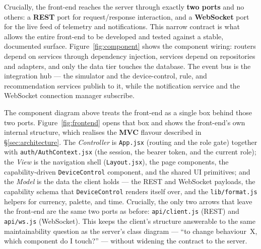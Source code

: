 Crucially, the front-end reaches the server through exactly \textbf{two ports} and no
others: a \textbf{REST} port for request/response interaction, and a
\textbf{WebSocket} port for the live feed of telemetry and notifications. This narrow
contract is what allows the entire front-end to be developed and tested against a
stable, documented surface. Figure~\ref{fig:component} shows the component wiring:
routers depend on services through dependency injection, services depend on
repositories and adapters, and only the data tier touches the database. The event
bus is the integration hub --- the simulator and the device-control, rule, and
recommendation services publish to it, while the notification service and the
WebSocket connection manager subscribe.


The component diagram above treats the front-end as a single box behind those two
ports. Figure~\ref{fig:frontend} opens that box and shows the front-end's own
internal structure, which realises the \textbf{MVC} flavour described in
\S\ref{sec:architecture}. The \emph{Controller} is \texttt{App.jsx} (routing and the
role gate) together with \texttt{auth/AuthContext.jsx} (the session, the bearer token,
and the current role); the \emph{View} is the navigation shell
(\texttt{Layout.jsx}), the page components, the capability-driven
\texttt{DeviceControl} component, and the shared UI primitives; and the
\emph{Model} is the data the client holds --- the REST and WebSocket payloads, the
capability schema that \texttt{DeviceControl} renders itself over, and the
\texttt{lib/format.js} helpers for currency, palette, and time. Crucially, the only
two arrows that leave the front-end are the same two ports as before:
\texttt{api/client.js} (REST) and \texttt{api/ws.js} (WebSocket). This keeps the
client's structure answerable to the same maintainability question as the server's
class diagram --- ``to change behaviour~X, which component do I touch?'' --- without
widening the contract to the server.


